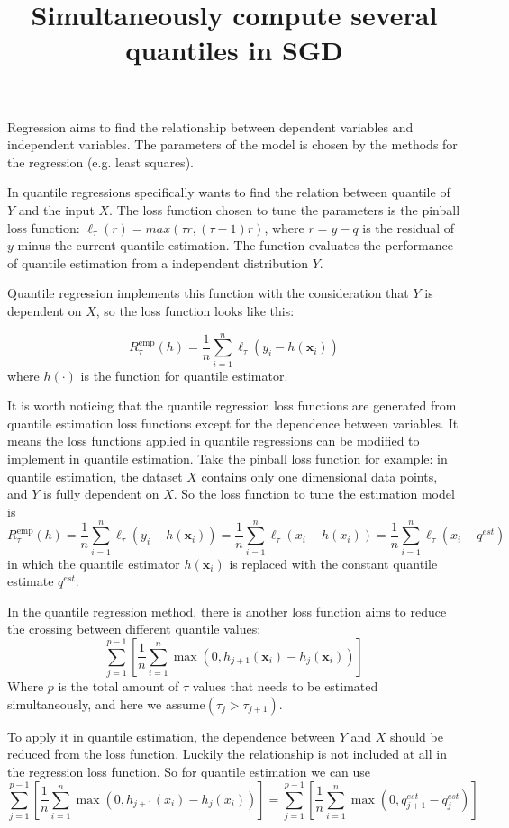 \documentclass[12pt]{article}
\title{Simultaneously compute several quantiles in SGD}
\date{\vspace{-5ex}}
\begin{document}
\maketitle

Regression aims to find the relationship between dependent variables and independent variables. The parameters of the model is chosen by the methods for the regression (e.g. least squares).

In quantile regressions specifically wants to find the relation between quantile of $Y$ and the input $X$. The loss function chosen to tune the parameters is the pinball loss function: $\ell_{\tau}(r) = max(\tau r, (\tau - 1)r)$, where $r = y - q$ is the residual of $y$ minus the current quantile estimation. The function evaluates the performance of quantile estimation from a independent distribution $Y$. 

Quantile regression implements this function with the consideration that $Y$ is dependent on $X$, so the loss function looks like this:

$$
R_{\tau}^{\mathrm{emp}}(h)=\frac{1}{n} \sum_{i=1}^{n} \ell_{\tau}\left(y_{i}-h\left(\mathbf{x}_{i}\right)\right)
$$
where $h(\cdot)$ is the function for quantile estimator.

It is worth noticing that the quantile regression loss functions are generated from quantile estimation loss functions except for the dependence between variables. It means the loss functions applied in quantile regressions can be modified to implement in quantile estimation. Take the pinball loss function for example:
in quantile estimation, the dataset $X$ contains only one dimensional data points, and $Y$ is fully dependent on $X$. So the loss function to tune the estimation model is
$$
R_{\tau}^{\mathrm{emp}}(h)=\frac{1}{n} \sum_{i=1}^{n} \ell_{\tau}\left(y_{i}-h\left(\mathbf{x}_{i}\right)\right)
= \frac{1}{n} \sum_{i=1}^{n} \ell_{\tau}\left(x_{i}-h\left({x}_{i}\right)\right) 
= \frac{1}{n} \sum_{i=1}^{n} \ell_{\tau}\left(x_{i}- q^{est}\right) 
$$
in which the quantile estimator $h\left(\mathbf{x}_{i}\right)$ is replaced with the constant quantile estimate $q^{est}$.

In the quantile regression method, there is another loss function aims to reduce the crossing between different quantile values:
$$
\sum_{j=1}^{p-1}\left[\frac{1}{n} \sum_{i=1}^{n} \max \left(0, h_{j+1}\left(\mathbf{x}_{i}\right)-h_{j}\left(\mathbf{x}_{i}\right)\right)\right]
$$
Where $p$ is the total amount of $\tau$ values that needs to be estimated simultaneously, and here we assume$(\tau_j > \tau_{j+1})$.


To apply it in quantile estimation, the dependence between $Y$ and $X$ should be reduced from the loss function. Luckily the relationship is not included at all in the regression loss function. So for quantile estimation we can use
$$
\sum_{j=1}^{p-1}\left[\frac{1}{n} \sum_{i=1}^{n} \max \left(0, h_{j+1}\left({x}_{i}\right)-h_{j}\left({x}_{i}\right)\right)\right]
= \sum_{j=1}^{p-1}\left[\frac{1}{n} \sum_{i=1}^{n} \max \left(0, q_{j+1}^{est}-q_{j}^{est}\right)\right]
$$
\end{document}
